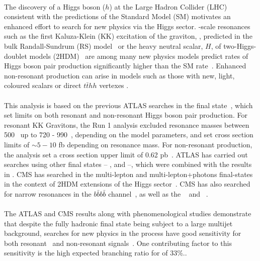 \paragraph{}
The discovery of a Higgs boson ($h$) \cite{Aad:2012tfa,Chatrchyan201230} at the Large Hadron Collider (LHC) consistent with the predictions of the Standard Model (SM) \cite{ATLAS:HiggsCouplings,PhysRevD.89.092007} motivates an enhanced effort to search for new physics via the Higgs sector.  
\TeV-scale resonances such as the first Kaluza-Klein (KK) excitation of the graviton,
\Grav, predicted in the bulk Randall-Sundrum (RS) model~\cite{Agashe:2007zd,Fitzpatrick} or the heavy neutral scalar, $H$, of two-Higgs-doublet models (2HDM)~\cite{Branco:2011iw} are among many new physics models predict rates of Higgs boson pair production significantly higher than the SM rate~\cite{PhysRevD.58.115012,Grigo20131,PhysRevLett.111.201801}. Enhanced non-resonant \pptohh production can arise in models such as those with new, light, coloured scalars \cite{PhysRevD.86.095023} or direct $t\bar{t}hh$ vertexes \cite{Grober:2010yv,Contino:2012xk}.

\paragraph{}
This analysis is based on the previous ATLAS searches in the \bbbb final state~\cite{ATLASHHbbbb, ATLAS-CONF-2016-017}, which set limits on both resonant and non-resonant Higgs boson pair production.  For resonant KK Gravitons, the Run 1 analysis excluded resonance masses between 500 \GeV\ up to 720 - 990~\GeV, depending on the model parameters, and set cross section limits of $\sim 5-10$ fb depending on resonance mass.  For non-resonant production, the analysis set a cross section upper limit of 0.62 pb~\cite{ATLASHHComb}.  ATLAS has carried out searches using other final states -- \bbgg, \bbtautau and \WWgg --, which were combined with the \bbbb results in \cite{ATLASHHComb}. CMS has searched in the multi-lepton and multi-lepton+photons final-states in the context of 2HDM extensions of the Higgs sector~\cite{Khachatryan:2014jya}. CMS has also searched for narrow resonances in the $b\bar{b}b\bar{b}$ channel~\cite{Khachatryan:2015yea}, as well as the \bbgg~\cite{CMSbbgammagamma} and \bbtautau~\cite{CMSbbtt}.

\paragraph{}
The ATLAS and CMS results along with phenomenological studies demonstrate that despite the fully hadronic final state being subject to a large multijet background, searches for new physics in the \pptofourb process have good sensitivity for both resonant~\cite{PhenoBBBB,GouzevitchBBBBPheno} and non-resonant signals~\cite{DeLimaBBBB, Wardrope:2014kya}. One contributing factor to this sensitivity is the high expected branching ratio for \hhbbbb of 33\%.. 

